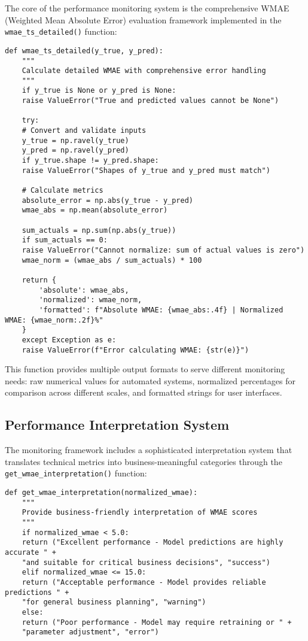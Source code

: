 The core of the performance monitoring system is the comprehensive WMAE (Weighted Mean Absolute Error) evaluation framework implemented in the \texttt{wmae\_ts\_detailed()} function:

\begin{lstlisting}[language=MyPython, caption={WMAE Performance Evaluation Function}]
	def wmae_ts_detailed(y_true, y_pred):
	"""
	Calculate detailed WMAE with comprehensive error handling
	"""
	if y_true is None or y_pred is None:
	raise ValueError("True and predicted values cannot be None")
	
	try:
	# Convert and validate inputs
	y_true = np.ravel(y_true)
	y_pred = np.ravel(y_pred)
	if y_true.shape != y_pred.shape:
	raise ValueError("Shapes of y_true and y_pred must match")
	
	# Calculate metrics
	absolute_error = np.abs(y_true - y_pred)
	wmae_abs = np.mean(absolute_error)
	
	sum_actuals = np.sum(np.abs(y_true))
	if sum_actuals == 0:
	raise ValueError("Cannot normalize: sum of actual values is zero")
	wmae_norm = (wmae_abs / sum_actuals) * 100
	
	return {
		'absolute': wmae_abs,
		'normalized': wmae_norm,
		'formatted': f"Absolute WMAE: {wmae_abs:.4f} | Normalized WMAE: {wmae_norm:.2f}%"
	}
	except Exception as e:
	raise ValueError(f"Error calculating WMAE: {str(e)}")
\end{lstlisting}

This function provides multiple output formats to serve different monitoring needs: raw numerical values for automated systems, normalized percentages for comparison across different scales, and formatted strings for user interfaces.

\subsection{Performance Interpretation System}

The monitoring framework includes a sophisticated interpretation system that translates technical metrics into business-meaningful categories through the \texttt{get\_wmae\_interpretation()} function:

\begin{lstlisting}[language=MyPython, caption={Performance Interpretation System}]
	def get_wmae_interpretation(normalized_wmae):
	"""
	Provide business-friendly interpretation of WMAE scores
	"""
	if normalized_wmae < 5.0:
	return ("Excellent performance - Model predictions are highly accurate " +
	"and suitable for critical business decisions", "success")
	elif normalized_wmae <= 15.0:
	return ("Acceptable performance - Model provides reliable predictions " +
	"for general business planning", "warning")
	else:
	return ("Poor performance - Model may require retraining or " +
	"parameter adjustment", "error")
\end{lstlisting}

